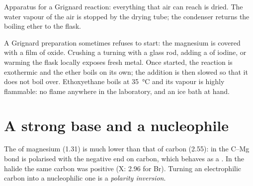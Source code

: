 \begin{omfigure}

{\small Apparatus for a Grignard reaction: everything that air can reach
is dried. The water vapour of the air is stopped by the drying tube; the
condenser returns the boiling ether to the flask.}
\end{omfigure}

\begin{inthelab}
A Grignard preparation sometimes refuses to start: the magnesium is
covered with a film of oxide. Crushing a turning with a glass rod, adding
a  of iodine, or warming the flask locally exposes fresh metal.
Once started, the reaction is exothermic and the ether boils on its own;
the addition is then slowed so that it does not boil over. Ethoxyethane
boils at \qty{35}{\celsius} and its vapour is highly flammable: no flame
anywhere in the laboratory, and an ice bath at hand.
\end{inthelab}

\section{A strong base and a nucleophile}

\begin{definition}\label{def:b1:organomagnesium:umpolung}
The  of magnesium (1.31) is much lower than that of
carbon (2.55): in  the C--Mg bond is polarised with the negative
end on carbon, which behaves as a . In the halide  the
same carbon was positive (X: 2.96 for Br). Turning an electrophilic carbon
into a nucleophilic one is a \emph{polarity inversion}.
\end{definition}

